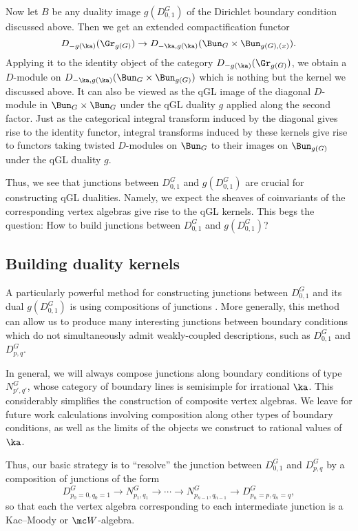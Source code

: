 \documentclass[11pt,reqno]{amsart}
\theoremstyle{plain}
\numberwithin{equation}{section}
\theoremstyle{definition}
\begin{document}
Now let $B$ be any duality image $g(D^G_{0,1})$ of the Dirichlet
boundary condition discussed above. Then we get an extended
compactification functor
$$
D_{-g(\ka)}(\Gr_{g(G)}) \to D_{-\ka,g(\ka)}(\Bun_G
\times \Bun_{g(G),(x)}).
$$
Applying it to the identity object of the category
$D_{-g(\ka)}(\Gr_{g(G)})$, we obtain a $D$-module on
$D_{-\ka,g(\ka)}(\Bun_G \times \Bun_{g(G)})$ which is nothing but the
kernel we discussed above. It can also be viewed as the qGL image of
the diagonal $D$-module in $\Bun_G \times \Bun_G$ under the qGL
duality $g$ applied along the second factor. Just as the categorical
integral transform induced by the diagonal gives rise to the identity
functor, integral transforms induced by these kernels give rise to
functors taking twisted $D$-modules on $\Bun_G$ to their images on
$\Bun_{g(G)}$ under the qGL duality $g$.

Thus, we see that junctions between $D^G_{0,1}$ and $g(D^G_{0,1})$ are
crucial for constructing qGL dualities. Namely, we expect the sheaves
of coinvariants of the corresponding vertex algebras give rise to the
qGL kernels. This begs the question: How to build junctions between
$D^G_{0,1}$ and $g(D^G_{0,1})$?

\subsection{Building duality kernels}    \label{building}

A particularly powerful method for constructing junctions between
$D^G_{0,1}$ and its dual $g(D^G_{0,1})$ is using compositions of
junctions \cite{CG}. More generally, this method can allow us to produce many
interesting junctions between boundary conditions which do not
simultaneously admit weakly-coupled descriptions, such as $D^G_{0,1}$
and $D^G_{p,q}$.

In general, we will always compose junctions along boundary conditions
of type $N^G_{p',q'}$, whose category of boundary lines is semisimple
for irrational $\ka$. This considerably simplifies the construction of
composite vertex algebras. We leave for future work calculations
involving composition along other types of boundary conditions, as
well as the limits of the objects we construct to rational values of
$\ka$.

Thus, our basic strategy is to ``resolve'' the junction between
$D^G_{0,1}$ and $D^G_{p,q}$ by a composition of junctions of the form
\begin{equation}
  D^G_{p_0=0,q_0=1} \to N^G_{p_1,q_1} \to \cdots \to
  N^G_{p_{n-1},q_{n-1}} \to D^G_{p_n=p,q_n=q},
\end{equation}
so that each the vertex algebra corresponding to each intermediate
junction is a Kac--Moody or ${\mc W}$-algebra.
\end{document}

